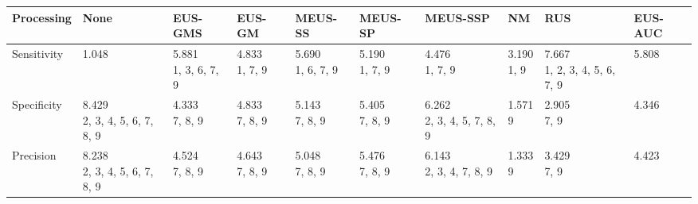 \begin{tabular}{llllllllll}
\toprule
Processing &                                                     None &                                         EUS-GMS &                                    EUS-GM &                                      MEUS-SS &                                      MEUS-SP &                                              MEUS-SSP &                                     NM &                                                      RUS &                            EUS-AUC \\
\midrule
Sensitivity       &                        \makecell{1.048 \\ \scriptsize{}} &  \makecell{5.881 \\ \scriptsize{1, 3, 6, 7, 9}} &  \makecell{4.833 \\ \scriptsize{1, 7, 9}} &  \makecell{5.690 \\ \scriptsize{1, 6, 7, 9}} &     \makecell{5.190 \\ \scriptsize{1, 7, 9}} &              \makecell{4.476 \\ \scriptsize{1, 7, 9}} &  \makecell{3.190 \\ \scriptsize{1, 9}} &  \makecell{7.667 \\ \scriptsize{1, 2, 3, 4, 5, 6, 7, 9}} &  \makecell{5.808 \\ \scriptsize{}} \\
Specificity       &  \makecell{8.429 \\ \scriptsize{2, 3, 4, 5, 6, 7, 8, 9}} &        \makecell{4.333 \\ \scriptsize{7, 8, 9}} &  \makecell{4.833 \\ \scriptsize{7, 8, 9}} &     \makecell{5.143 \\ \scriptsize{7, 8, 9}} &     \makecell{5.405 \\ \scriptsize{7, 8, 9}} &  \makecell{6.262 \\ \scriptsize{2, 3, 4, 5, 7, 8, 9}} &     \makecell{1.571 \\ \scriptsize{9}} &                    \makecell{2.905 \\ \scriptsize{7, 9}} &  \makecell{4.346 \\ \scriptsize{}} \\
Precision         &  \makecell{8.238 \\ \scriptsize{2, 3, 4, 5, 6, 7, 8, 9}} &        \makecell{4.524 \\ \scriptsize{7, 8, 9}} &  \makecell{4.643 \\ \scriptsize{7, 8, 9}} &     \makecell{5.048 \\ \scriptsize{7, 8, 9}} &     \makecell{5.476 \\ \scriptsize{7, 8, 9}} &     \makecell{6.143 \\ \scriptsize{2, 3, 4, 7, 8, 9}} &     \makecell{1.333 \\ \scriptsize{9}} &                    \makecell{3.429 \\ \scriptsize{7, 9}} &  \makecell{4.423 \\ \scriptsize{}} \\

\end{tabular}
